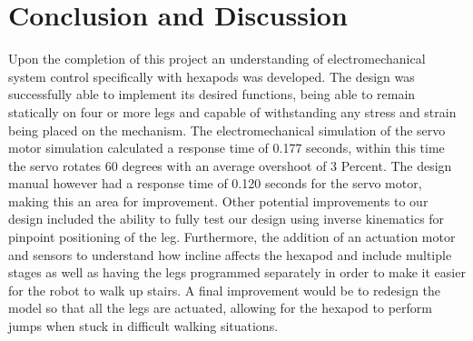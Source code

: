 


\section{Conclusion and Discussion}

Upon the completion of this project an understanding of electromechanical system control specifically with hexapods was developed. The design was successfully able to implement its desired functions, being able to remain statically on four or more legs and capable of withstanding any stress and strain being placed on the mechanism. The electromechanical simulation of the servo motor simulation calculated a response time of 0.177 seconds, within this time the servo rotates 60 degrees with an average overshoot of 3 Percent. The design manual however had a response time of 0.120 seconds for the servo motor, making this an area for improvement. Other potential improvements to our design included the ability to fully test our design using inverse kinematics for  pinpoint positioning of the leg. Furthermore, the addition of an  actuation motor and sensors to understand how incline affects the hexapod and include multiple stages as well as having the legs programmed separately in order to make it easier for the robot to walk up stairs. A final improvement would be to redesign the model so that all the legs are actuated, allowing for the hexapod to perform jumps when stuck in difficult walking situations.









